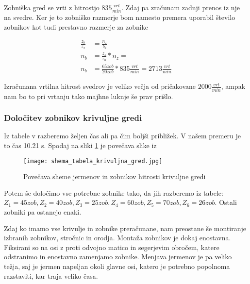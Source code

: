 Zobniška gred se vrti z hitrostjo \(835 \frac{vrt}{min}\). Zdaj pa zračunam
zadnji prenos iz nje na svedre. Ker je to zobniško razmerje bom namesto
premera uporabil število zobnikov kot tudi prestavno razmerje za zobnike

\begin{equation}
	\label{eq:12}
	\begin{split}
		\frac{z_b}{z_z} &= \frac{n_z}{b_b} \\
		n_b &= \frac{z_z}{z_b} * n_z = \\
		n_b &= \frac{65 zob}{20 zob} * 835 \frac{vrt}{min} = 2713 \frac{vrt}{min}
	\end{split}
\end{equation}

Izračunana vrtilna hitrost svedrov je veliko večja od pričakovane \(2000\frac{vrt}{min}\),
ampak nam bo to pri vrtanju tako majhne luknje še prav prišlo.

\subsubsection{Določitev zobnikov krivuljne gredi}

Iz tabele v  razberemo željen čas
ali pa čim boljši približek. V našem premeru je to čas 10.21 s.
Spodaj na sliki \ref{povecava} je povečava slike iz 
\begin{figure}[H]
	\begin{center}
		\texttt{[image: shema\_tabela\_krivuljna\_gred.jpg]}
		\caption{Povečava sheme jermenov in zobnikov
			hitrosti krivuljne gredi
			\cite{gauthier}}
		\label{povecava}
	\end{center}
\end{figure}

Potem še določimo vse potrebne zobnike tako, da jih razberemo iz tabele: \\
\(Z_1 = 45 zob, Z_2 = 40 zob, Z_3 = 25 zob, Z_4 = 60 zob, Z_5 = 70 zob, Z_6 = 26 zob\).
Ostali zobniki pa ostanejo enaki.

Zdaj ko imamo vse krivulje in zobnike preračunane, nam preostane še montiranje izbranih
zobnikov, stročnic in orodja. Montaža zobnikov je dokaj enostavna.
Fiksirani so na osi z proti odvojno matico in segerjevim obročem,
katere odstranimo in enostavno zamenjamo zobnike. Menjava jermenov
je pa veliko težja, saj je jermen napeljan okoli glavne osi,
katero je potrebno popolnoma razstaviti, kar traja veliko časa.